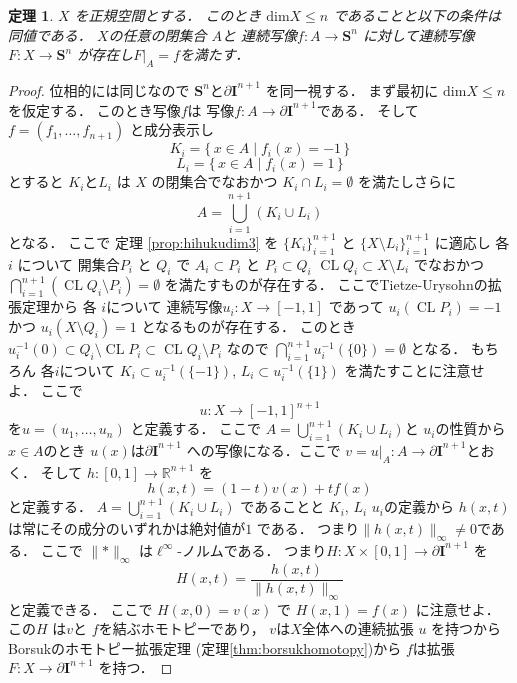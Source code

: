 \documentclass[leqno, a4paper, 12pt]{jsarticle}
\newtheorem{thm}{定理}
\newcommand{\rr}{\mathbb{R}}
\DeclareMathOperator{\cl}{CL}
\newcommand{\yodim}{\mathrm{dim}}
\newcommand{\yosphere}[1]{\mathbf{S}^{#1}}
\newcommand{\yocubebd}[1]{\partial\mathbf{I}^{#1}}
\numberwithin{equation}{section}
\begin{document}
\begin{thm}
$X$
を正規空間とする．
このとき
$\yodim X\le n$
であることと以下の条件は同値である．
$X$の任意の閉集合
$A$と
連続写像$f\colon A\to \yosphere{n}$
に対して連続写像
$F\colon X\to \yosphere{n}$
が存在し$F|_{A}=f$を満たす．
\end{thm}
\begin{proof}
位相的には同じなので
$\yosphere{n}$と$\yocubebd{n+1}$
を同一視する．
まず最初に
$\yodim X\le n$
を仮定する．
このとき写像$f$は
写像$f\colon A\to \yocubebd{n+1}$である．
そして$f=(f_{1}, \dots, f_{n+1})$
と成分表示し
\[
K_{i}=\{\, x\in A\mid f_{i}(x)=-1\, \}
\]
\[
L_{i}=\{\, x\in A\mid f_{i}(x)=1\, \}
\]
とすると
$K_{i}$と$L_{i}$
は
$X$
の閉集合でなおかつ
$K_{i}\cap L_{i}=\emptyset$
を満たしさらに
\[
A=\bigcup_{i=1}^{n+1}(K_{i}\cup L_{i})
\]
となる．
ここで
定理
\ref{prop:hihukudim3}
を
$\{K_{i}\}_{i=1}^{n+1}$
と
$\{X\setminus L_{i}\}_{i=1}^{n+1}$
に適応し
各
$i$
について
開集合$P_{i}$
と
$Q_{i}$
で
$A_{i}\subset P_{i}$
と
$P_{i}\subset Q_{i}$
$\cl Q_{i}\subset X\setminus L_{i}$
でなおかつ
$\bigcap_{i=1}^{n+1}(\cl Q_{i}\setminus P_{i})=\emptyset$
を満たすものが存在する．
ここでTietze-Urysohnの拡張定理から
各
$i$について
連続写像$u_{i}\colon X\to [-1, 1]$
であって
$u_{i}(\cl P_{i})=-1$
かつ
$u_{i}(X\setminus Q_{i})=1$
となるものが存在する．
このとき
$u_{i}^{-1}(0)\subset Q_{i}\setminus \cl P_{i}\subset \cl Q_{i}\setminus P_{i}$
なので
$\bigcap_{i=1}^{n+1}u_{i}^{-1}(\{0\})=\emptyset$
となる．
もちろん
各$i$について
$K_{i}\subset u_{i}^{-1}(\{-1\})$, 
$L_{i}\subset u_{i}^{-1}(\{1\})$
を満たすことに注意せよ．
ここで
\[
u\colon X\to [-1, 1]^{n+1}
\]
を$u=(u_{1}, \dots, u_{n})$
と定義する．
ここで
$A=\bigcup_{i=1}^{n+1}(K_{i}\cup L_{i})$と
$u_{i}$の性質から$x\in A$のとき
$u(x)$は$\yocubebd{n+1}$
への写像になる．ここで
$v=u|_{A}\colon A\to \yocubebd{n+1}$とおく．
そして
$h\colon [0, 1]\to \rr^{n+1}$
を
\[
h(x, t)=(1-t)v(x)+tf(x)
\]
と定義する．
$A=\bigcup_{i=1}^{n+1}(K_{i}\cup L_{i})$
であることと
$K_{i}$, $L_{i}$
$u_{i}$の定義から
$h(x, t)$は常にその成分のいずれかは絶対値が$1$
である．
つまり$\lVert h(x, t)\lVert_{\infty}\neq 0$である．
ここで
$\lVert*\rVert_{\infty}$
は$\ell^{\infty}$-ノルムである．
つまり$H\colon X\times [0, 1]\to \yocubebd{n+1}$
を
\[
H(x, t)=\frac{h(x, t)}{\lVert h(x, t)\lVert_{\infty}}
\]
と定義できる．
ここで
$H(x, 0)=v(x)$
で
$H(x, 1)=f(x)$
に注意せよ．
この$H$
は$v$と
$f$を結ぶホモトピーであり，
$v$は$X$全体への連続拡張
$u$
を持つから
Borsukのホモトピー拡張定理
(定理\ref{thm:borsukhomotopy})から
$f$は拡張$F\colon X\to \yocubebd{n+1}$
を持つ．


\end{proof}
\end{document}
